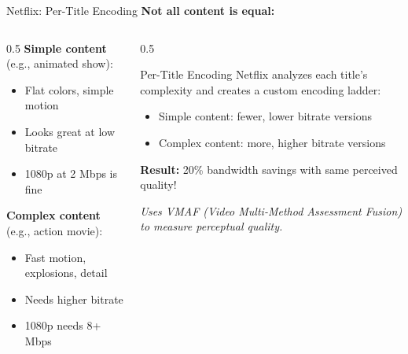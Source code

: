 \documentclass[aspectratio=169,12pt]{beamer}
\begin{document}
\begin{frame}{Netflix: Per-Title Encoding}
    \textbf{Not all content is equal:}
    
    \vspace{0.3cm}
    \begin{columns}
        \begin{column}{0.5\textwidth}
            \textbf{Simple content} (e.g., animated show):
            \begin{itemize}
                \item Flat colors, simple motion
                \item Looks great at low bitrate
                \item 1080p at 2 Mbps is fine
            \end{itemize}
            
            \vspace{0.3cm}
            \textbf{Complex content} (e.g., action movie):
            \begin{itemize}
                \item Fast motion, explosions, detail
                \item Needs higher bitrate
                \item 1080p needs 8+ Mbps
            \end{itemize}
        \end{column}
        \begin{column}{0.5\textwidth}
            \begin{block}{Per-Title Encoding}
                Netflix analyzes each title's complexity and creates a custom encoding ladder:
                \begin{itemize}
                    \item Simple content: fewer, lower bitrate versions
                    \item Complex content: more, higher bitrate versions
                \end{itemize}
                
                \vspace{0.2cm}
                \textbf{Result:} 20\% bandwidth savings with same perceived quality!
            \end{block}
            
            \vspace{0.2cm}
            \textit{Uses VMAF (Video Multi-Method Assessment Fusion) to measure perceptual quality.}
        \end{column}
    \end{columns}
\end{frame}
\end{document}
